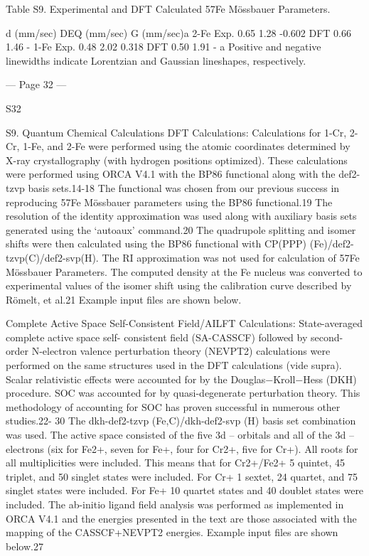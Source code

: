 Table S9. Experimental and DFT Calculated 57Fe Mössbauer Parameters. 
 
 
d (mm/sec) 
DEQ (mm/sec) 
G (mm/sec)a 
2-Fe 
Exp. 
0.65 
1.28 
-0.602 
DFT 
0.66 
1.46 
- 
1-Fe 
Exp. 
0.48 
2.02 
0.318 
DFT 
0.50 
1.91 
- 
a Positive and negative linewidths indicate Lorentzian and Gaussian lineshapes, respectively. 
 
 


--- Page 32 ---
 
 
S32 
 
 
S9. Quantum Chemical Calculations 
DFT Calculations: Calculations for 1-Cr, 2-Cr, 1-Fe, and 2-Fe were performed using the atomic coordinates determined by 
X-ray crystallography (with hydrogen positions optimized). These calculations were performed using ORCA V4.1 with the 
BP86 functional along with the def2-tzvp basis sets.14-18 The functional was chosen from our previous success in 
reproducing 57Fe Mössbauer parameters using the BP86 functional.19 The resolution of the identity approximation was 
used along with auxiliary basis sets generated using the ‘autoaux’ command.20 The quadrupole splitting and isomer shifts were 
then calculated using the BP86 functional with CP(PPP) (Fe)/def2-tzvp(C)/def2-svp(H). The RI approximation was not used 
for calculation of 57Fe Mössbauer Parameters. The computed density at the Fe nucleus was converted to experimental values 
of the isomer shift using the calibration curve described by Römelt, et al.21 Example input files are shown below. 
 
Complete Active Space Self-Consistent Field/AILFT Calculations: State-averaged complete active space self- consistent 
field (SA-CASSCF) followed by second-order N-electron valence perturbation theory (NEVPT2) calculations were 
performed on the same structures used in the DFT calculations (vide supra). Scalar relativistic effects were 
accounted for by the Douglas−Kroll−Hess (DKH) procedure. SOC was accounted for by quasi-degenerate 
perturbation theory. This methodology of accounting for SOC has proven successful in numerous other studies.22-
30 The dkh-def2-tzvp (Fe,C)/dkh-def2-svp (H) basis set combination was used. The active space consisted of the 
five 3d – orbitals and all of the 3d – electrons (six for Fe2+, seven for Fe+, four for Cr2+, five for Cr+). All roots for 
all multiplicities were included. This means that for Cr2+/Fe2+ 5 quintet, 45 triplet, and 50 singlet states were 
included. For Cr+ 1 sextet, 24 quartet, and 75 singlet states were included. For Fe+ 10 quartet states and 40 doublet 
states were included. The ab-initio ligand field analysis was performed as implemented in ORCA V4.1 and the 
energies presented in the text are those associated with the mapping of the CASSCF+NEVPT2 energies. Example 
input files are shown below.27 
 
